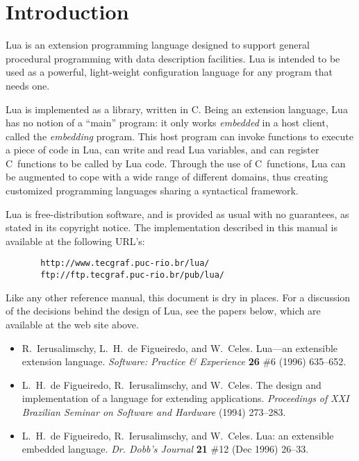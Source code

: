 \documentclass[11pt]{article}
\begin{document}
\newpage
\null
\newpage
\tableofcontents

\newpage
\setcounter{page}{1}
\pagestyle{plain}


\section{Introduction}

Lua is an extension programming language designed to support
general procedural programming with data description
facilities.
Lua is intended to be used as a powerful, light-weight
configuration language for any program that needs one.

Lua is implemented as a library, written in C.
Being an extension language, Lua has no notion of a ``main'' program:
it only works \emph{embedded} in a host client,
called the \emph{embedding} program.
This host program can invoke functions to execute a piece of
code in Lua, can write and read Lua variables,
and can register C~functions to be called by Lua code.
Through the use of C~functions, Lua can be augmented to cope with
a wide range of different domains,
thus creating customized programming languages sharing a syntactical framework.

Lua is free-distribution software,
and is provided as usual with no guarantees,
as stated in its copyright notice.
The implementation described in this manual is available
at the following URL's:
\begin{verbatim}
       http://www.tecgraf.puc-rio.br/lua/
       ftp://ftp.tecgraf.puc-rio.br/pub/lua/
\end{verbatim}

Like any other reference manual,
this document is dry in places.
For a discussion of the decisions behind the design of Lua,
see the papers below,
which are available at the web site above.
\begin{itemize}
\item
R.~Ierusalimschy, L.~H.~de Figueiredo, and W.~Celes.
Lua---an extensible extension language.
\emph{Software: Practice \& Experience} {\bf 26} \#6 (1996) 635--652.
\item
L.~H.~de Figueiredo, R.~Ierusalimschy, and W.~Celes.
The design and implementation of a language for extending applications.
\emph{Proceedings of XXI Brazilian Seminar on Software and Hardware} (1994) 273--283.
\item
L.~H.~de Figueiredo, R.~Ierusalimschy, and W.~Celes.
Lua: an extensible embedded language.
\emph{Dr. Dobb's Journal} {\bf  21} \#12 (Dec 1996) 26--33.
\end{itemize}
\end{document}
